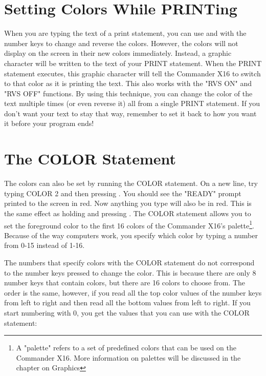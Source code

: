\section{Setting Colors While PRINTing}

When you are typing the text of a print statement, you can use \ctrlkey and
\altkey with the number keys to change and reverse the colors.  However, the
colors will not display on the screen in their new colors immediately.
Instead, a graphic character will be written to the text of your {\ttfamily
PRINT} statement.  When the {\ttfamily PRINT} statement executes, this graphic
character will tell the Commander X16 to switch to that color as it is printing
the text.  This also works with the "RVS ON" and "RVS OFF" functions.  By using
this technique, you can change the color of the text multiple times (or even
reverse it) all from a single {\ttfamily PRINT} statement.  If you don't want
your text to stay that way, remember to set it back to how you want it before
your program ends!\\

\section{The COLOR Statement}

The colors can also be set by running the {\ttfamily COLOR} statement.  On a
new line, try typing {\ttfamily COLOR 2} and then pressing \returnkey.  You
should see the "READY" prompt printed to the screen in red.  Now anything you
type will also be in red.  This is the same effect as holding \ctrlkey and
pressing .  The {\ttfamily COLOR} statement allows you to set the
foreground color to the first 16 colors of the Commander X16's
palette\footnote{A "palette" refers to a set of predefined colors that can be
used on the Commander X16.  More information on palettes will be discussed in
the chapter on Graphics}.  Because of the way computers work, you specify which
color by typing a number from 0-15 instead of 1-16.

The numbers that specify colors with the {\ttfamily COLOR} statement do not
correspond to the number keys pressed to change the color.  This is because
there are only 8 number keys that contain colors, but there are 16 colors to
choose from.  The order is the same, however, if you read all the top color
values of the number keys from left to right and then read all the bottom
values from left to right.  If you start numbering with 0, you get the values
that you can use with the {\ttfamily COLOR} statement:\\

